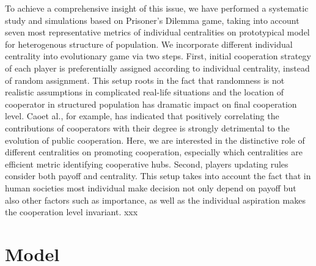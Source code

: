 \documentclass[preprint,12pt,3p]{elsarticle}
\begin{document}
To achieve a comprehensive insight of this issue, we have performed a systematic
study and simulations based on Prisoner’s Dilemma game, taking into account seven most representative metrics of individual centralities on prototypical model for heterogenous structure of population.
    We incorporate different individual centrality into evolutionary game via two steps.
    First, initial cooperation strategy of each player is preferentially assigned according to individual centrality, instead of random assignment.
This setup roots in the fact that randomness is not realistic assumptions in complicated real-life situations and the location of cooperator in structured population has dramatic impact on final cooperation level.
Caoet al.\cite{PercGómez-Gardeñes-18249}, for example, has indicated that positively correlating the contributions of cooperators with their degree is strongly detrimental to the evolution of public cooperation.
Here, we are interested in the distinctive role of different centralities on promoting cooperation,
especially which centralities are efficient metric identifying cooperative hubs.
    Second, players updating rules consider both payoff and centrality.
This setup takes into account the fact that in human societies most individual make decision
not only depend on payoff but also other factors such as importance, as well as the individual aspiration makes the cooperation level invariant\cite{DuWu-18162}.
xxx

\section{Model}
\end{document}
